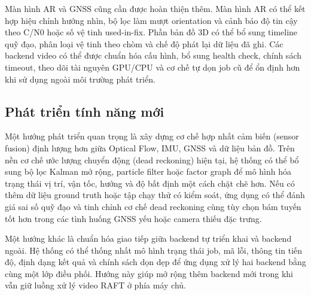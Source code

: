 \documentclass[../DoAn.tex]{subfiles}
\begin{document}
Màn hình AR và GNSS cũng cần được hoàn thiện thêm. Màn hình AR có thể kết hợp hiệu chỉnh hướng nhìn, bộ lọc làm mượt orientation và cảnh báo độ tin cậy theo C/N0 hoặc số vệ tinh used-in-fix. Phần bản đồ 3D có thể bổ sung timeline quỹ đạo, phân loại vệ tinh theo chòm và chế độ phát lại dữ liệu đã ghi. Các backend video có thể được chuẩn hóa cấu hình, bổ sung health check, chính sách timeout, theo dõi tài nguyên GPU/CPU và cơ chế tự dọn job cũ để ổn định hơn khi sử dụng ngoài môi trường phát triển.

\subsection{Phát triển tính năng mới}
\label{subsection:6.2.2}
Một hướng phát triển quan trọng là xây dựng cơ chế hợp nhất cảm biến (sensor fusion) định lượng hơn giữa Optical Flow, IMU, GNSS và dữ liệu bản đồ. Trên nền cơ chế ước lượng chuyển động (dead reckoning) hiện tại, hệ thống có thể bổ sung bộ lọc Kalman mở rộng, particle filter hoặc factor graph để mô hình hóa trạng thái vị trí, vận tốc, hướng và độ bất định một cách chặt chẽ hơn. Nếu có thêm dữ liệu ground truth hoặc tập chạy thử có kiểm soát, ứng dụng có thể đánh giá sai số quỹ đạo và tinh chỉnh cơ chế dead reckoning cùng tùy chọn bám tuyến tốt hơn trong các tình huống GNSS yếu hoặc camera thiếu đặc trưng.

Một hướng khác là chuẩn hóa giao tiếp giữa backend tự triển khai và backend ngoài. Hệ thống có thể thống nhất mô hình trạng thái job, mã lỗi, thông tin tiến độ, định dạng kết quả và chính sách dọn dẹp để ứng dụng xử lý hai backend bằng cùng một lớp điều phối. Hướng này giúp mở rộng thêm backend mới trong khi vẫn giữ luồng xử lý video RAFT ở phía máy chủ.
\end{document}
